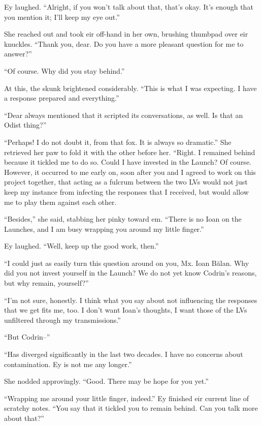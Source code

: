 Ey laughed. ``Alright, if you won't talk about that, that's okay. It's enough that you mention it; I'll keep my eye out.''

She reached out and took eir off-hand in her own, brushing thumbpad over eir knuckles. ``Thank you, dear. Do you have a more pleasant question for me to answer?''

``Of course. Why did you stay behind.''

At this, the skunk brightened considerably. ``This is what I was expecting. I have a response prepared and everything.''

``Dear always mentioned that it scripted its conversations, as well. Is that an Odist thing?''

``Perhaps! I do not doubt it, from that fox. It is always so dramatic.'' She retrieved her paw to fold it with the other before her. ``Right. I remained behind because it tickled me to do so. Could I have invested in the Launch? Of course. However, it occurred to me early on, soon after you and I agreed to work on this project together, that acting as a fulcrum between the two LVs would not just keep my instance from infecting the responses that I received, but would allow me to play them against each other.

``Besides,'' she said, stabbing her pinky toward em. ``There is no Ioan on the Launches, and I am busy wrapping you around my little finger.''

Ey laughed. ``Well, keep up the good work, then.''

``I could just as easily turn this question around on you, Mx. Ioan Bălan. Why did you not invest yourself in the Launch? We do not yet know Codrin's reasons, but why remain, yourself?''

``I'm not sure, honestly. I think what you say about not influencing the responses that we get fits me, too. I don't want Ioan's thoughts, I want those of the LVs unfiltered through my transmissions.''

``But Codrin--''

``Has diverged significantly in the last two decades. I have no concerns about contamination. Ey is not me any longer.''

She nodded approvingly. ``Good. There may be hope for you yet.''

``Wrapping me around your little finger, indeed.'' Ey finished eir current line of scratchy notes. ``You say that it tickled you to remain behind. Can you talk more about that?''

